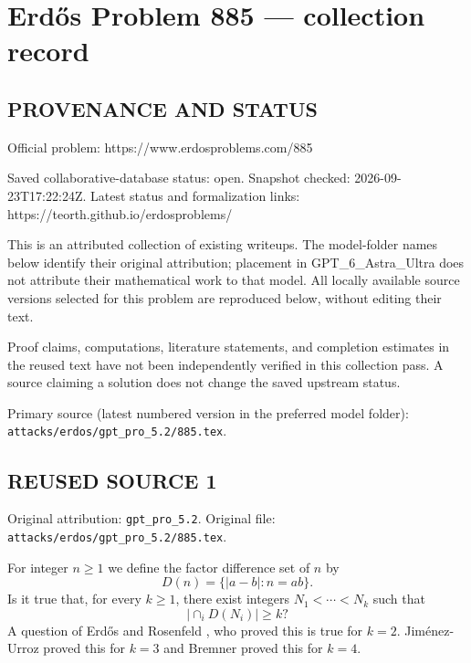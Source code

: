\section*{Erd\H{o}s Problem 885 --- collection record}

\subsection*{PROVENANCE AND STATUS}
Official problem: https://www.erdosproblems.com/885

Saved collaborative-database status: open.
Snapshot checked: 2026-09-23T17:22:24Z.
Latest status and formalization links: https://teorth.github.io/erdosproblems/

This is an attributed collection of existing writeups. The model-folder names below identify their original attribution; placement in GPT\_6\_Astra\_Ultra does not attribute their mathematical work to that model. All locally available source versions selected for this problem are reproduced below, without editing their text.

Proof claims, computations, literature statements, and completion estimates in the reused text have not been independently verified in this collection pass. A source claiming a solution does not change the saved upstream status.

Primary source (latest numbered version in the preferred model folder): \texttt{attacks/erdos/gpt\_pro\_5.2/885.tex}.

\subsection*{REUSED SOURCE 1}
Original attribution: \texttt{gpt\_pro\_5.2}.
Original file: \texttt{attacks/erdos/gpt\_pro\_5.2/885.tex}.


For integer $n\geq 1$ we define the factor difference set of $n$ by
\[D(n) = \{\lvert a-b\rvert : n=ab\}.\]
Is it true that, for every $k\geq 1$, there exist integers $N_1<\cdots<N_k$ such that
\[\lvert \cap_i D(N_i)\rvert \geq k?\]
A question of Erd\H{o}s and Rosenfeld \cite{ErRo97}, who proved this is true for $k=2$. Jim\'{e}nez-Urroz \cite{Ji99} proved this for $k=3$ and Bremner \cite{Br19} proved this for $k=4$.

